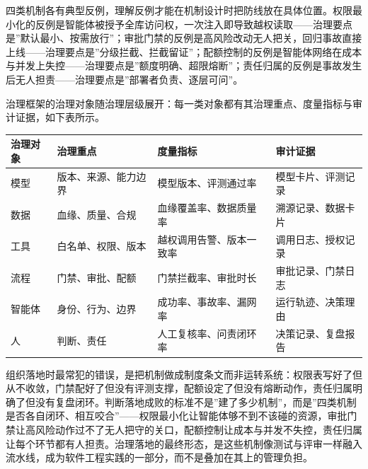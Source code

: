 \documentclass[
]{ctexbook}
\newcounter{none}
\begin{document}
四类机制各有典型反例，理解反例才能在机制设计时把防线放在具体位置。权限最小化的反例是智能体被授予全库访问权，一次注入即导致越权读取------治理要点是''默认最小、按需放行''；审批门禁的反例是高风险改动无人把关，回归事故直接上线------治理要点是''分级拦截、拦截留证''；配额控制的反例是智能体网络在成本与并发上失控------治理要点是''额度明确、超限熔断''；责任归属的反例是事故发生后无人担责------治理要点是''部署者负责、逐层可问''。

治理框架的治理对象随治理层级展开：每一类对象都有其治理重点、度量指标与审计证据，如下表所示。

{\def\LTcaptype{none} %
\begin{longtable}[]{@{}
  >{\raggedright\arraybackslash}p{}
  >{\raggedright\arraybackslash}p{}
  >{\raggedright\arraybackslash}p{}
  >{\raggedright\arraybackslash}p{}@{}}
\toprule\noalign{}
\begin{minipage}[b]{\linewidth}\raggedright
治理对象
\end{minipage} & \begin{minipage}[b]{\linewidth}\raggedright
治理重点
\end{minipage} & \begin{minipage}[b]{\linewidth}\raggedright
度量指标
\end{minipage} & \begin{minipage}[b]{\linewidth}\raggedright
审计证据
\end{minipage} \\
\midrule\noalign{}
\endhead
\bottomrule\noalign{}
\endlastfoot
模型 & 版本、来源、能力边界 & 模型版本、评测通过率 &
模型卡片、评测记录 \\
数据 & 血缘、质量、合规 & 血缘覆盖率、数据质量率 & 溯源记录、数据卡片 \\
工具 & 白名单、权限、版本 & 越权调用告警、版本一致率 &
调用日志、授权记录 \\
流程 & 门禁、审批、配额 & 门禁拦截率、审批时长 & 审批记录、门禁日志 \\
智能体 & 身份、行为、边界 & 成功率、事故率、漏网率 &
运行轨迹、决策理由 \\
人 & 判断、责任 & 人工复核率、问责闭环率 & 决策记录、复盘报告 \\
\end{longtable}
}

组织落地时最常犯的错误，是把机制做成制度条文而非运转系统：权限表写好了但从不收敛，门禁配好了但没有评测支撑，配额设定了但没有熔断动作，责任归属明确了但没有复盘闭环。判断落地成败的标准不是''建了多少机制''，而是''四类机制是否各自闭环、相互咬合''------权限最小化让智能体够不到不该碰的资源，审批门禁让高风险动作过不了无人把守的关口，配额控制让成本与并发不失控，责任归属让每个环节都有人担责。治理落地的最终形态，是这些机制像测试与评审一样融入流水线，成为软件工程实践的一部分，而不是叠加在其上的管理负担。
\end{document}
